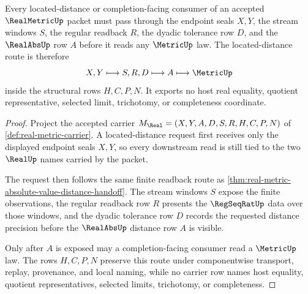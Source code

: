 \begin{theorem}
\label{thm:real-metric-located-distance-handoff}
Every located-distance or completion-facing consumer of an accepted $\RealMetricUp$ packet must pass through the endpoint seals $X,Y$, the stream windows $S$, the regular readback $R$, the dyadic tolerance row $D$, and the $\RealAbsUp$ row $A$ before it reads any $\MetricUp$ law. The located-distance route is therefore
$$
X,Y \longmapsto S,R,D \longmapsto A \longmapsto \MetricUp
$$
inside the structural rows $H,C,P,N$. It exports no host real equality, quotient representative, selected limit, trichotomy, or completeness coordinate.
\end{theorem}
\begin{proof}
Project the accepted carrier $M_{\Real}=(X,Y,A,D,S,R,H,C,P,N)$ of \autoref{def:real-metric-carrier}. A located-distance request first receives only the displayed endpoint seals $X,Y$, so every downstream read is still tied to the two $\RealUp$ names carried by the packet.

The request then follows the same finite readback route as \autoref{thm:real-metric-absolute-value-distance-handoff}. The stream windows $S$ expose the finite observations, the regular readback row $R$ presents the $\RegSeqRatUp$ data over those windows, and the dyadic tolerance row $D$ records the requested distance precision before the $\RealAbsUp$ distance row $A$ is visible.

Only after $A$ is exposed may a completion-facing consumer read a $\MetricUp$ law. The rows $H,C,P,N$ preserve this route under componentwise transport, replay, provenance, and local naming, while no carrier row names host equality, quotient representatives, selected limits, trichotomy, or completeness.
\end{proof}


